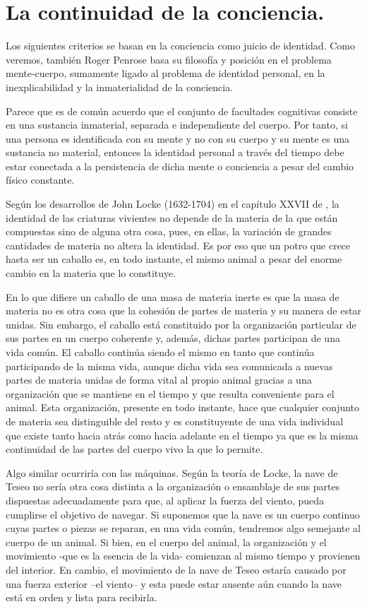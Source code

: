 \documentclass[main.tex]{subfiles}
\begin{document}
	\section{La continuidad de la conciencia.}
	
	Los siguientes criterios se basan en la conciencia como juicio de identidad. Como veremos, también Roger Penrose \cite{penrose2015nueva} basa su filosofía y posición en el problema mente-cuerpo, sumamente ligado al problema de identidad personal, en la inexplicabilidad y la inmaterialidad de la conciencia.
	
	Parece que es de común acuerdo que el conjunto de facultades cognitivas consiste en una sustancia inmaterial, separada e independiente del cuerpo. Por tanto, si una persona es identificada con su mente y no con su cuerpo y su mente es una sustancia no material, entonces la identidad personal a través del tiempo debe estar conectada a la persistencia de dicha mente o conciencia a pesar del cambio físico constante.
	
	
	Según los desarrollos de John Locke (1632-1704) en el capítulo XXVII de \cite{nidditch1975john}, la identidad de las criaturas vivientes no depende de la materia de la que están compuestas sino de alguna otra cosa, pues, en ellas, la variación de grandes cantidades de materia no  altera la identidad. Es por eso que un potro que crece hasta ser un caballo es, en todo instante, el mismo animal a pesar del enorme cambio en la materia que lo constituye.
	
	En lo que difiere un caballo de una masa de materia inerte es que la masa de materia no es otra cosa que la cohesión de partes de materia y su manera de estar unidas. Sin embargo, el caballo está constituido por la organización particular de sus partes en un cuerpo coherente y, además, dichas partes participan de una vida común. El caballo continúa siendo el mismo en tanto que continúa  participando de la misma vida, aunque dicha vida sea comunicada a nuevas partes de materia unidas de forma vital al propio animal gracias a una organización que se mantiene en el tiempo y que resulta conveniente para el animal. Esta organización, presente en todo instante, hace que cualquier conjunto de materia sea distinguible del resto y es constituyente de una vida individual que existe tanto hacia atrás como hacia adelante en el tiempo ya que es la misma continuidad de las partes del cuerpo vivo la que lo permite.
	
	Algo similar ocurriría con las máquinas. Según la teoría de Locke, la nave de Teseo no sería otra cosa distinta a la organización o ensamblaje de sus partes dispuestas adecuadamente para que, al aplicar  la fuerza del viento, pueda cumplirse el objetivo de navegar. Si suponemos que la nave es un cuerpo continuo cuyas partes o piezas se reparan, en una vida común, tendremos algo semejante al cuerpo de un animal. Si bien, en el cuerpo del animal, la organización y el movimiento -que es la esencia de la vida- comienzan al mismo tiempo y provienen del interior. En cambio, el movimiento de la nave de Teseo estaría causado por una fuerza exterior –el viento– y esta puede estar ausente aún cuando la nave está en orden y lista para recibirla.
	
\end{document}
